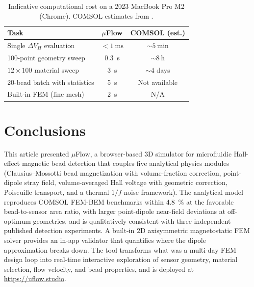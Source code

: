 \documentclass[preprint,12pt,a4paper]{elsarticle}
\begin{document}
\begin{table}[!htbp]
\centering
\footnotesize
\begin{tabular}{lcc}
\toprule
Task & $\mu$Flow & COMSOL (est.) \cite{govindaraju2025} \\
\midrule
Single $\Delta V_H$ evaluation & ${<}\SI{1}{\milli\second}$ & ${\sim}\SI{5}{\minute}$ \\
100-point geometry sweep & \SI{0.3}{\second} & ${\sim}\SI{8}{\hour}$ \\
$12 \times 100$ material sweep & \SI{3}{\second} & ${\sim}$4 days \\
20-bead batch with statistics & \SI{5}{\second} & Not available \\
Built-in FEM (fine mesh) & \SI{2}{\second} & N/A \\
\bottomrule
\end{tabular}
\caption{Indicative computational cost on a 2023 MacBook Pro M2 (Chrome). COMSOL estimates from \cite{govindaraju2025}.}
\label{tab:perf}
\end{table}

\section{Conclusions}

This article presented $\mu$Flow, a browser-based 3D simulator for microfluidic Hall-effect magnetic bead detection that couples five analytical physics modules (Clausius--Mossotti bead magnetization with volume-fraction correction, point-dipole stray field, volume-averaged Hall voltage with geometric correction, Poiseuille transport, and a thermal $1/f$ noise framework). The analytical model reproduces COMSOL FEM-BEM benchmarks within \SI{4.8}{\percent} at the favorable bead-to-sensor area ratio, with larger point-dipole near-field deviations at off-optimum geometries, and is qualitatively consistent with three independent published detection experiments. A built-in 2D axisymmetric magnetostatic FEM solver provides an in-app validator that quantifies where the dipole approximation breaks down. The tool transforms what was a multi-day FEM design loop into real-time interactive exploration of sensor geometry, material selection, flow velocity, and bead properties, and is deployed at \url{https://uflow.studio}.

\end{document}
